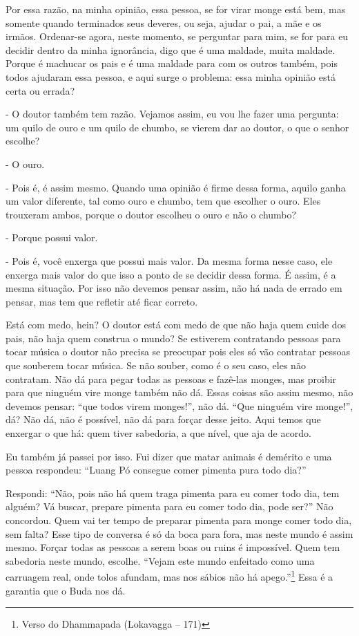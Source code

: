Por essa razão, na minha opinião, essa pessoa, se for virar monge
está bem, mas somente quando terminados seus deveres, ou seja, ajudar o
pai, a mãe e os irmãos. Ordenar-se agora, neste momento, se perguntar
para mim, se for para eu decidir dentro da minha ignorância, digo que é
uma maldade, muita maldade. Porque é machucar os pais e é uma maldade
para com os outros também, pois todos ajudaram essa pessoa, e aqui
surge o problema: essa minha opinião está certa ou errada?

{}- O doutor também tem razão. Vejamos assim, eu vou lhe fazer uma
pergunta: um quilo de ouro e um quilo de chumbo, se vierem dar ao
doutor, o que o senhor escolhe? 

{}- O ouro.

{}- Pois é, é assim mesmo. Quando uma opinião é firme dessa forma,
aquilo ganha um valor diferente, tal como ouro e chumbo, tem que
escolher o ouro. Eles trouxeram ambos, porque o doutor escolheu o ouro
e não o chumbo?

{}- Porque possui valor.

{}- Pois é, você enxerga que possui mais valor. Da mesma forma nesse
caso, ele enxerga mais valor do que isso a ponto de se decidir dessa
forma. É assim, é a mesma situação. Por isso não devemos pensar assim,
não há nada de errado em pensar, mas tem que refletir até ficar
correto.

Está com medo, hein? O doutor está com medo de que não haja quem
cuide dos pais, não haja quem construa o mundo? Se estiverem
contratando pessoas para tocar música o doutor não precisa se preocupar
pois eles só vão contratar pessoas que souberem tocar música. Se não
souber, como é o seu caso, eles não contratam. Não dá para pegar todas
as pessoas e fazê-las monges, mas proibir para que ninguém vire monge
também não dá. Essas coisas são assim mesmo, não devemos pensar: “que
todos virem monges!”, não dá. “Que ninguém vire monge!”, dá? Não dá,
não é possível, não dá para forçar desse jeito. Aqui temos que enxergar
o que há: quem tiver sabedoria, a que nível, que aja de acordo.

Eu também já passei por isso. Fui dizer que matar animais é demérito
e uma pessoa respondeu: “Luang Pó consegue comer pimenta pura todo
dia?” 

Respondi: “Não, pois não há quem traga pimenta para eu comer todo
dia, tem alguém? Vá buscar, prepare pimenta para eu comer todo dia,
pode ser?” Não concordou. Quem vai ter tempo de preparar pimenta para
monge comer todo dia, sem falta? Esse tipo de conversa é só da boca
para fora, mas neste mundo é assim mesmo. Forçar todas as pessoas a
serem boas ou ruins é impossível. Quem tem sabedoria neste mundo,
escolhe. “Vejam este mundo enfeitado como uma carruagem real, onde
tolos afundam, mas nos sábios não há apego.”\footnote{Verso do
Dhammapada (Lokavagga – 171)} Essa é a garantia que o Buda nos dá. 

